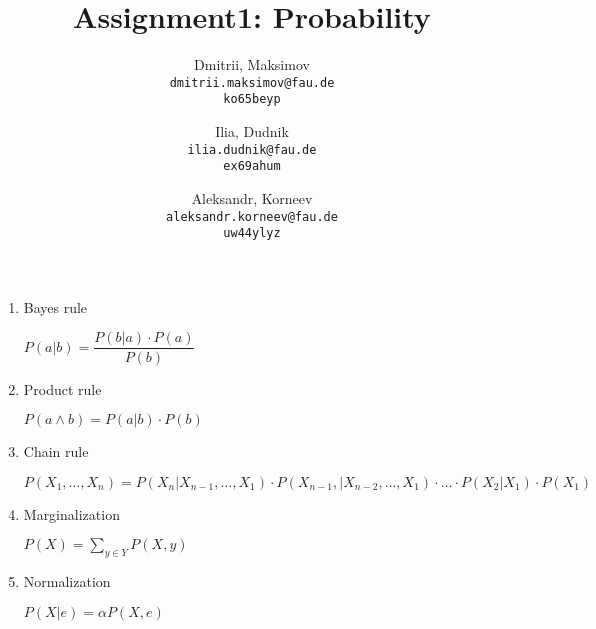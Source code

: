 \documentclass{homework}
\title{Assignment1: Probability}
\author{
  Dmitrii, Maksimov\\
  \texttt{dmitrii.maksimov@fau.de} \\
  \texttt{ko65beyp}
  \and
  Ilia, Dudnik\\
  \texttt{ilia.dudnik@fau.de}\\
  \texttt{ex69ahum}
  \and
  Aleksandr, Korneev\\
  \texttt{aleksandr.korneev@fau.de}\\
  \texttt{uw44ylyz}
}
\begin{document}
\maketitle

\begin{enumerate}
	\item Bayes rule
	
	$P(a|b) = \dfrac{P(b|a)\cdot P(a)}{P(b)}$
	\item Product rule
	
	$P(a\land b) = P(a|b)\cdot P(b)$
	\item Chain rule
	
	$P(X_1, \ldots,X_n) = P(X_n|X_{n-1}, \ldots,X_1)\cdot P(X_{n-1},|X_{n-2}, \ldots,X_1)\cdot \ldots \cdot P(X_2|X_1) \cdot P(X_1)$
	\item Marginalization
	
	$P(X)=\sum_{y\in Y}P(X, y)$
	\item Normalization

	$P(X|e)=\alpha P(X,e)$
\end{enumerate}
\end{document}
